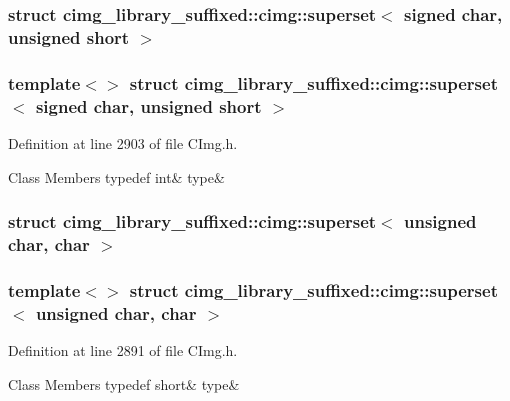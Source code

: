 \subsubsection{struct cimg\+\_\+library\+\_\+suffixed\+:\+:cimg\+:\+:superset$<$ signed char, unsigned short $>$}
\subsubsection*{template$<$$>$\newline
struct cimg\+\_\+library\+\_\+suffixed\+::cimg\+::superset$<$ signed char, unsigned short $>$}



Definition at line 2903 of file C\+Img.\+h.

\begin{DoxyFields}{Class Members}
\mbox{\label{namespacecimg__library__suffixed_1_1cimg_a7adfc7af518217b389efb0bfc0a8c16c}} 
typedef int&
type&
\\
\hline

\end{DoxyFields}
\label{structcimg__library__suffixed_1_1cimg_1_1superset_3_01unsigned_01char_00_01char_01_4}
\subsubsection{struct cimg\+\_\+library\+\_\+suffixed\+:\+:cimg\+:\+:superset$<$ unsigned char, char $>$}
\subsubsection*{template$<$$>$\newline
struct cimg\+\_\+library\+\_\+suffixed\+::cimg\+::superset$<$ unsigned char, char $>$}



Definition at line 2891 of file C\+Img.\+h.

\begin{DoxyFields}{Class Members}
\mbox{\label{namespacecimg__library__suffixed_1_1cimg_a3163e996e3a2b37ac3a396aa76db475e}} 
typedef short&
type&
\\
\hline

\end{DoxyFields}
\label{structcimg__library__suffixed_1_1cimg_1_1superset_3_01unsigned_01char_00_01cimg__int64_01_4}
